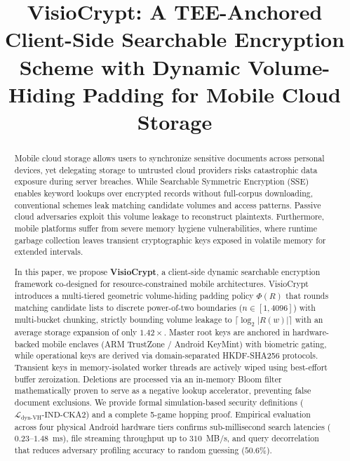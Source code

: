 \documentclass[10pt,conference]{IEEEtran}
\begin{document}
\title{VisioCrypt: A TEE-Anchored Client-Side Searchable Encryption Scheme with Dynamic Volume-Hiding Padding for Mobile Cloud Storage}

\author{
}

\maketitle
\thispagestyle{empty}
\pagestyle{empty}

\begin{abstract}
Mobile cloud storage allows users to synchronize sensitive documents across personal devices, yet delegating storage to untrusted cloud providers risks catastrophic data exposure during server breaches. While Searchable Symmetric Encryption (SSE) enables keyword lookups over encrypted records without full-corpus downloading, conventional schemes leak matching candidate volumes and access patterns. Passive cloud adversaries exploit this volume leakage to reconstruct plaintexts. Furthermore, mobile platforms suffer from severe memory hygiene vulnerabilities, where runtime garbage collection leaves transient cryptographic keys exposed in volatile memory for extended intervals.

In this paper, we propose \textbf{VisioCrypt}, a client-side dynamic searchable encryption framework co-designed for resource-constrained mobile architectures. VisioCrypt introduces a multi-tiered geometric volume-hiding padding policy $\Phi(R)$ that rounds matching candidate lists to discrete power-of-two boundaries ($n \in [1, 4096]$) with multi-bucket chunking, strictly bounding volume leakage to $\lceil \log_2 |R(w)| \rceil$ with an average storage expansion of only $1.42\times$. Master root keys are anchored in hardware-backed mobile enclaves (ARM TrustZone / Android KeyMint) with biometric gating, while operational keys are derived via domain-separated HKDF-SHA256 protocols. Transient keys in memory-isolated worker threads are actively wiped using best-effort buffer zeroization. Deletions are processed via an in-memory Bloom filter mathematically proven to serve as a negative lookup accelerator, preventing false document exclusions. We provide formal simulation-based security definitions ($\mathcal{L}_{\text{dyn-VH}}\text{-IND-CKA2}$) and a complete 5-game hopping proof. Empirical evaluation across four physical Android hardware tiers confirms sub-millisecond search latencies ($0.23$--$1.48$~ms), file streaming throughput up to $310$~MB/s, and query decorrelation that reduces adversary profiling accuracy to random guessing ($50.6\%$).
\end{abstract}
\end{document}
